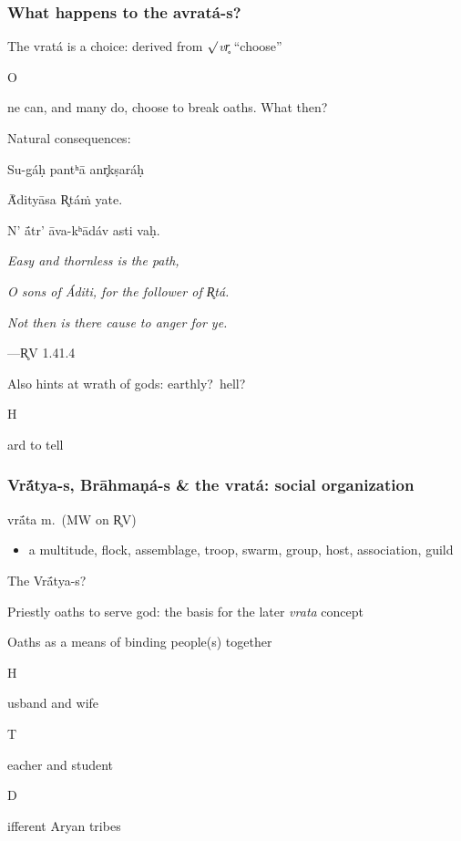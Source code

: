 \documentclass[pdf]{beamer}
\newcommand{\Subitem}[1]{{\setlength\itemindent{12pt} \item[-] #1}}
\begin{document}
\begin{frame} \frametitle{What happens to the avratá-s?}
\begin{itemize}
	\item The vratá is a choice: derived from $\surd$\textit{vr̥} ``choose''
	\Subitem One can, and many do, choose to break oaths. What then?
	\item Natural consequences:
\end{itemize}
\begin{center}
	Su-gáḥ pantʰā anr̥kṣaráḥ

	Ā́dityāsa R̥táṁ yate.

	N’ ā́tr’ āva-kʰādáv asti vaḥ.

	\vspace{12pt}

	\textit{Easy and thornless is the path,}

	\textit{O sons of Áditi, for the follower of R̥tá.}

	\textit{Not then is there cause to anger for ye.}

	\vspace{12pt}

 	---R̥V 1.41.4
\end{center}
\begin{itemize}
	\item Also hints at wrath of gods: earthly?~hell?
	\Subitem Hard to tell
\end{itemize}
\end{frame}

\begin{frame} \frametitle{Vrā́tya-s, Brāhmaṇá-s \& the vratá: social organization}
\begin{block} {vrā́ta m.~(MW on R̥V)}
\begin{itemize}
	\item a multitude, flock, assemblage, troop, swarm, group, host, association, guild
\end{itemize}
\end{block}
\begin{itemize}
	\item The Vrā́tya-s?
	\item Priestly oaths to serve god: the basis for the later \textit{vrata} concept
	\item Oaths as a means of binding people(s) together
	\Subitem Husband and wife
	\Subitem Teacher and student
	\Subitem Different Aryan tribes
\end{itemize}
\end{frame}
\end{document}
